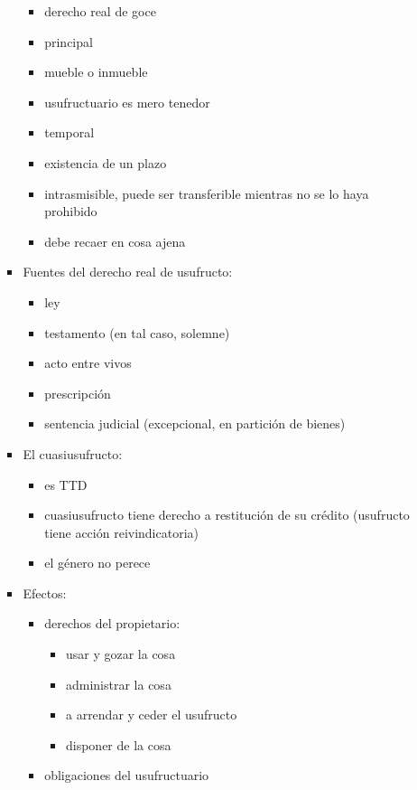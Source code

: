 \documentclass[]{article}
\providecommand{\tightlist}{%
  \setlength{\itemsep}{0pt}\setlength{\parskip}{0pt}}
\begin{document}
\begin{itemize}
\begin{itemize}
\begin{itemize}
      \begin{itemize}
      \tightlist
      \item
        derecho real de goce
      \item
        principal
      \item
        mueble o inmueble
      \item
        usufructuario es mero tenedor
      \item
        temporal
      \item
        existencia de un plazo
      \item
        intrasmisible, puede ser transferible mientras no se lo haya
        prohibido
      \item
        debe recaer en cosa ajena
      \end{itemize}
    \item
      Fuentes del derecho real de usufructo:

      \begin{itemize}
      \tightlist
      \item
        ley
      \item
        testamento (en tal caso, solemne)
      \item
        acto entre vivos
      \item
        prescripción
      \item
        sentencia judicial (excepcional, en partición de bienes)
      \end{itemize}
    \item
      El cuasiusufructo:

      \begin{itemize}
      \tightlist
      \item
        es TTD
      \item
        cuasiusufructo tiene derecho a restitución de su crédito
        (usufructo tiene acción reivindicatoria)
      \item
        el género no perece
      \end{itemize}
    \item
      Efectos:

      \begin{itemize}
      \tightlist
      \item
        derechos del propietario:

        \begin{itemize}
        \tightlist
        \item
          usar y gozar la cosa
        \item
          administrar la cosa
        \item
          a arrendar y ceder el usufructo
        \item
          disponer de la cosa
        \end{itemize}
      \item
        obligaciones del usufructuario


\end{itemize}
\end{itemize}
\end{itemize}
\end{itemize}
\end{document}
